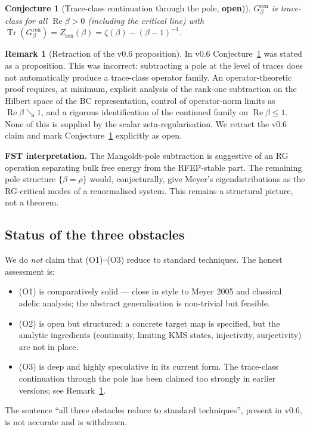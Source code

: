 \documentclass[11pt,a4paper]{article}
\theoremstyle{plain}
\newtheorem{conjecture}[theorem]{Conjecture}
\theoremstyle{definition}
\newtheorem{remark}[theorem]{Remark}
\DeclareMathOperator{\Tr}{Tr}
\renewcommand{\Re}{\operatorname{Re}}
\begin{document}
\begin{conjecture}[Trace-class continuation through the pole,
\textbf{open})]
\label{conj:ren-trace-class}
$G_\beta^{\mathrm{ren}}$ is trace-class for all $\Re\beta > 0$
(including the critical line) with
$\Tr(G_\beta^{\mathrm{ren}}) = Z_{\mathrm{ren}}(\beta) = \zeta(\beta)
- (\beta - 1)^{-1}$.
\end{conjecture}

\begin{remark}[Retraction of the v0.6 proposition]
\label{rem:o3-retraction}
In v0.6 Conjecture~\ref{conj:ren-trace-class} was stated as a
proposition.  This was incorrect: subtracting a pole at the level
of traces does not automatically produce a trace-class operator
family.  An operator-theoretic proof requires, at minimum, explicit
analysis of the rank-one subtraction on the Hilbert space of the BC
representation, control of operator-norm limits as $\Re\beta
\searrow 1$, and a rigorous identification of the continued family
on $\Re\beta \le 1$.  None of this is supplied by the scalar
zeta-regularisation.  We retract the v0.6 claim and mark
Conjecture~\ref{conj:ren-trace-class} explicitly as open.
\end{remark}

\textbf{FST interpretation.}  The Mangoldt-pole subtraction is
suggestive of an RG operation separating bulk free energy from the
RFEP-stable part.  The remaining pole structure $\{\beta = \rho\}$
would, conjecturally, give Meyer's eigendistributions as the
RG-critical modes of a renormalised system.  This remains a
structural picture, not a theorem.

\subsection{Status of the three obstacles}

We do \emph{not} claim that (O1)--(O3) reduce to standard techniques.
The honest assessment is:
\begin{itemize}[leftmargin=*]
\item (O1) is comparatively solid --- close in style to Meyer 2005
  and classical adelic analysis; the abstract generalisation is
  non-trivial but feasible.
\item (O2) is open but structured: a concrete target map is
  specified, but the analytic ingredients (continuity, limiting KMS
  states, injectivity, surjectivity) are not in place.
\item (O3) is deep and highly speculative in its current form.  The
  trace-class continuation through the pole has been claimed too
  strongly in earlier versions; see Remark~\ref{rem:o3-retraction}.
\end{itemize}
The sentence ``all three obstacles reduce to standard techniques'',
present in v0.6, is not accurate and is withdrawn.
\end{document}
